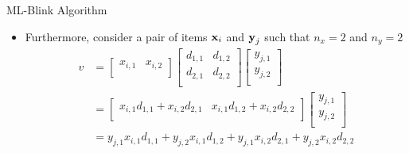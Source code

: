 \begin{frame}{ML-Blink Algorithm}
    \begin{itemize}
        \item Furthermore, consider a pair of items $\boldsymbol{\mathbf{x}}_i$ and $\boldsymbol{\mathbf{y}}_j$ such that $n_x = 2$ and $n_y = 2$
            \begin{equation} 
                \begin{split} 
                    v &= 
                        \begin{bmatrix}
                            x_{i,1} & x_{i,2} \\
                        \end{bmatrix}
                        \begin{bmatrix}
                            d_{1,1} & d_{1,2} \\
                            d_{2,1} & d_{2,2} \\
                        \end{bmatrix}
                        \begin{bmatrix}
                            y_{j,1} \\
                            y_{j,2} \\
                        \end{bmatrix} \\
                    &=
                        \begin{bmatrix}
                            x_{i,1}d_{1,1} + x_{i,2}d_{2,1} & x_{i,1}d_{1,2} + x_{i,2}d_{2,2} \\
                        \end{bmatrix}    
                        \begin{bmatrix}
                            y_{j,1} \\
                            y_{j,2} \\
                        \end{bmatrix} \\
                    &= 
                        y_{j,1}x_{i,1}d_{1,1} + y_{j,2}x_{i,1}d_{1,2} + y_{j,1}x_{i,2}d_{2,1} + y_{j,2}x_{i,2}d_{2,2} \\
                \end{split}
            \end{equation}
    \end{itemize}
\end{frame}

